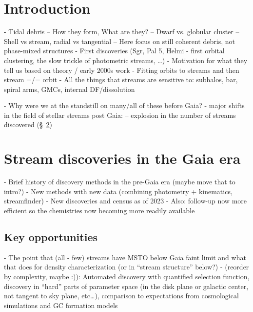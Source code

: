 \documentclass[authoryear]{elsarticle}
\begin{document}
\begin{frontmatter}
\begin{keyword}



\end{keyword}

\end{frontmatter}


\section{Introduction}
\label{sec:intro}
- Tidal debris
-- How they form, What are they? 
-- Dwarf vs. globular cluster
-- Shell vs stream, radial vs tangential
-- Here focus on still coherent debris, not phase-mixed structures
- First discoveries (Sgr, Pal 5, Helmi - first orbital clustering, the slow trickle of photometric streams, …)
- Motivation for what they tell us based on theory / early 2000s work
- Fitting orbits to streams and then stream =/= orbit
- All the things that streams are sensitive to: subhalos, bar, spiral arms, GMCs, internal DF/dissolution

- Why were we at the standstill on many/all of these before Gaia?
- major shifts in the field of stellar streams post Gaia:
-- explosion in the number of streams discovered (\S~\ref{sec:discovery})

\section{Stream discoveries in the Gaia era}
\label{sec:discovery}
- Brief history of discovery methods in the pre-Gaia era (maybe move that to intro?)
- New methods with new data (combining photometry + kinematics, streamfinder)
- New discoveries and census as of 2023
- Also: follow-up now more efficient so the chemistries now becoming more readily available

\subsection{Key opportunities}
- The point that (all - few) streams have MSTO below Gaia faint limit and what that does for density characterization (or in “stream structure” below?)
- (reorder by complexity, maybe :)): Automated discovery with quantified selection function, discovery in “hard” parts of parameter space (in the disk plane or galactic center, not tangent to sky plane, etc…), comparison to expectations from cosmological simulations and GC formation models
\end{document}
